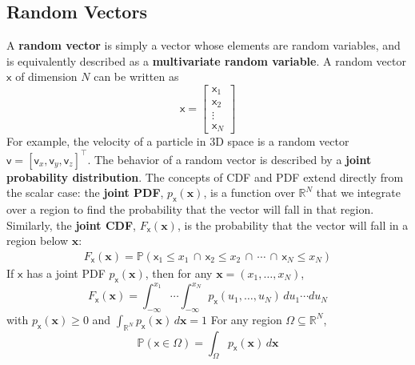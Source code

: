 \subsection{Random Vectors}
A \textbf{random vector} is simply a vector whose elements are  random variables, and is equivalently described as a \textbf{multivariate random variable}. A random vector $\boldsymbol{\mathsf{x}}$ of dimension $N$ can be written as
\begin{equation}
    \boldsymbol{\mathsf{x}} = 
    \begin{bmatrix}
        \mathsf{x}_1 \\
        \mathsf{x}_2 \\
        \vdots \\
        \mathsf{x}_N
    \end{bmatrix}
\end{equation}
For example, the velocity of a particle in 3D space is a random vector $\boldsymbol{\mathsf{v}} = [\mathsf{v}_x, \mathsf{v}_y, \mathsf{v}_z]^\top$. The behavior of a random vector is described by a \textbf{joint probability distribution}. The concepts of CDF and PDF extend directly from the scalar case: the \textbf{joint PDF}, $p_{\boldsymbol{\mathsf{x}}}(\mathbf{x})$, is a function over $\mathbb{R}^N$ that we integrate over a region to find the probability that the vector will fall in that region. Similarly, the \textbf{joint CDF}, $F_{\boldsymbol{\mathsf{x}}}(\mathbf{x})$, is the probability that the vector will fall in a region below $\mathbf{x}$:
\begin{align}
  F_{\boldsymbol{\mathsf{x}}}(\mathbf{x})
  = \mathbb{P}\!\left( \mathsf{x}_1 \le x_1 \,\cap\, \mathsf{x}_2 \le x_2 \,\cap\, \cdots \,\cap\, \mathsf{x}_N \le x_N \right)
\end{align}
If $\boldsymbol{\mathsf{x}}$ has a joint PDF $p_{\boldsymbol{\mathsf{x}}}(\mathbf{x})$, then for any $\mathbf{x}=(x_1,\dots,x_N)$,
\begin{equation}
  F_{\boldsymbol{\mathsf{x}}}(\mathbf{x})
  = \int_{-\infty}^{x_1}\!\cdots\!\int_{-\infty}^{x_N}
      p_{\boldsymbol{\mathsf{x}}}(u_1,\dots,u_N)\,du_1\cdots du_N
\end{equation}
with $p_{\boldsymbol{\mathsf{x}}}(\mathbf{x})\ge 0$ and $\int_{\mathbb{R}^N} p_{\boldsymbol{\mathsf{x}}}(\mathbf{x})\,d\mathbf{x}=1$
For any region $\Omega\subseteq\mathbb{R}^N$,
\begin{equation}
  \mathbb{P}(\boldsymbol{\mathsf{x}}\in\Omega)
  = \int_{\Omega} p_{\boldsymbol{\mathsf{x}}}(\mathbf{x})\,d\mathbf{x}
\end{equation}


